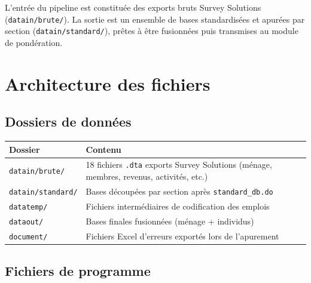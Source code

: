 \documentclass[11pt, a4paper]{article}
\begin{document}
L'entrée du pipeline est constituée des exports bruts Survey Solutions
(\texttt{datain/brute/}). La sortie est un ensemble de bases standardisées
et apurées par section (\texttt{datain/standard/}), prêtes à être fusionnées
puis transmises au module de pondération.

\section{Architecture des fichiers}

\subsection{Dossiers de données}

\begin{longtable}{@{}lp{9cm}@{}}
\toprule
\textbf{Dossier} & \textbf{Contenu} \\
\midrule
\texttt{datain/brute/} & 18 fichiers \texttt{.dta} exports Survey Solutions
  (ménage, membres, revenus, activités, etc.) \\
\texttt{datain/standard/} & Bases découpées par section après
  \texttt{standard\_db.do} \\
\texttt{datatemp/} & Fichiers intermédiaires de codification des emplois \\
\texttt{dataout/} & Bases finales fusionnées (ménage + individus) \\
\texttt{document/} & Fichiers Excel d'erreurs exportés lors de l'apurement \\
\bottomrule
\end{longtable}

\subsection{Fichiers de programme}
\end{document}

